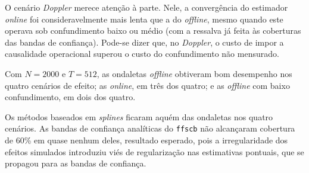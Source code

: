 O cenário \emph{Doppler} merece atenção à parte. 
Nele, a convergência do estimador \emph{online} foi consideravelmente mais lenta que a do \emph{offline}, mesmo quando este operava sob confundimento baixo ou médio (com a ressalva já feita às coberturas das bandas de confiança). 
Pode-se dizer que, no \emph{Doppler}, o custo de impor a causalidade operacional superou o custo do confundimento não mensurado.

Com \(N = 2000\) e \(T = 512\), as ondaletas \emph{offline} obtiveram bom desempenho nos quatro cenários de efeito; as \emph{online}, em três dos quatro; e as \emph{offline} com baixo confundimento, em dois dos quatro.

Os métodos baseados em \emph{splines} ficaram aquém das ondaletas nos quatro cenários. 
As bandas de confiança analíticas do \texttt{ffscb} não alcançaram cobertura de 60\% em quase nenhum deles, resultado esperado, pois a irregularidade dos efeitos simulados introduziu viés de regularização nas estimativas pontuais, que se propagou para as bandas de confiança. 

